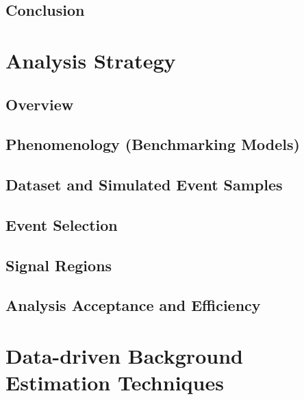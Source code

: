 \documentclass{outhesis}
\begin{document}
\section{Conclusion}\label{sec:roib.concl}


\chapter{Analysis Strategy}\label{chap:strategy}
\graphicspath{{figures/strategy/}}
\section{Overview}\label{sec:strategy.overview}

\section{Phenomenology (Benchmarking Models)}\label{sec:strategy.pheno}

\section{Dataset and Simulated Event Samples}\label{sec:strategy.samples}

\section{Event Selection}\label{sec:strategy.sel}

\section{Signal Regions}\label{sec:strategy.sr}

\section{Analysis Acceptance and Efficiency}\label{sec:strategy.sr}


\chapter{Data-driven Background Estimation Techniques}\label{chap:fake}
\graphicspath{{figures/fake/}}
\end{document}
